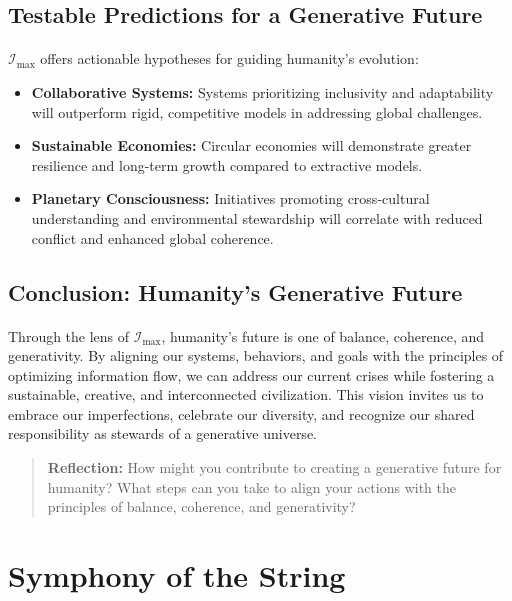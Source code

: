 \documentclass[12pt]{article}
\begin{document}
\subsection{Testable Predictions for a Generative Future}
\paragraph{}
\(\mathcal{I}_{\text{max}}\) offers actionable hypotheses for guiding humanity’s evolution:
\begin{itemize}
    \item \textbf{Collaborative Systems:} Systems prioritizing inclusivity and adaptability will outperform rigid, competitive models in addressing global challenges.
    \item \textbf{Sustainable Economies:} Circular economies will demonstrate greater resilience and long-term growth compared to extractive models.
    \item \textbf{Planetary Consciousness:} Initiatives promoting cross-cultural understanding and environmental stewardship will correlate with reduced conflict and enhanced global coherence.
\end{itemize}

\subsection{Conclusion: Humanity’s Generative Future}
\paragraph{}
Through the lens of \(\mathcal{I}_{\text{max}}\), humanity’s future is one of balance, coherence, and generativity. By aligning our systems, behaviors, and goals with the principles of optimizing information flow, we can address our current crises while fostering a sustainable, creative, and interconnected civilization. This vision invites us to embrace our imperfections, celebrate our diversity, and recognize our shared responsibility as stewards of a generative universe.

\begin{quote}
\textbf{Reflection:}  
How might you contribute to creating a generative future for humanity? What steps can you take to align your actions with the principles of balance, coherence, and generativity?
\end{quote}


\section{Symphony of the String}
\end{document}
